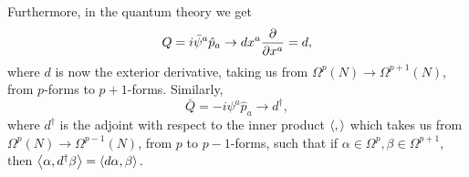 Furthermore, in the quantum theory we get
\begin{equation}
    Q=i\bar \psi^a \hat p_a \to dx^a \P{}{x^a} = d,
\end{equation}
where $d$ is now the exterior derivative, taking us from $\Omega^p(N)\to \Omega^{p+1}(N)$, from $p$-forms to $p+1$-forms.
Similarly,
\begin{equation}
    \bar Q = -i\psi^a \hat p_a \to d^\dagger,
\end{equation}
where $d^\dagger$ is the adjoint with respect to the inner product $\avg{{},{}}$ which takes us from $\Omega^p(N)\to \Omega^{p-1}(N)$, from $p$ to $p-1$-forms, such that if $\alpha\in \Omega^p, \beta\in \Omega^{p+1},$ then $\avg{\alpha,d^\dagger\beta}=\avg{d \alpha, \beta}.$